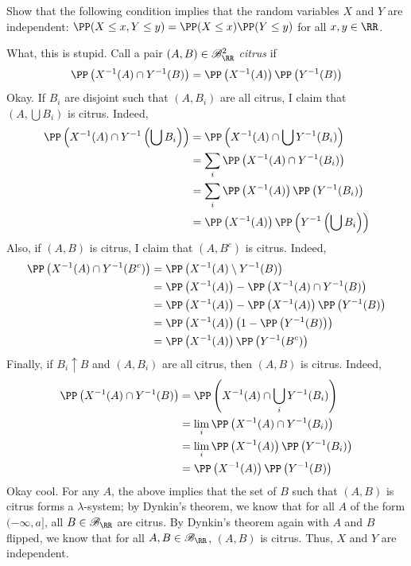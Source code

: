 \documentclass[11pt, headheight=30pt]{scrartcl}
\begin{document}
\begin{prob*}
    Show that the following condition implies that the random variables $X$ and $Y$
    are independent: $\PP(X \leq x, Y\leq y) = \PP(X\leq x)\PP(Y\leq y)$
    for all $x, y \in \RR$.
\end{prob*}
What, this is stupid. Call a pair $(A,B)\in \mathscr{B}_{\RR}^2$ \emph{citrus}
if
\[
    \PP\left(X^{-1}(A)\cap Y^{-1}(B)\right) = \PP\left(X^{-1}(A)\right)\PP\left(Y^{-1}(B)\right)
\]
Okay. If $B_i$ are disjoint such that $(A, B_i)$ are all citrus,
I claim that $(A, \bigcup B_i)$ is citrus. Indeed,
\begin{align*}
    \PP\left(X^{-1}(A)\cap Y^{-1}\left(\bigcup B_i\right)\right) &= \PP\left(X^{-1}(A)\cap \bigcup Y^{-1}(B_i)\right)\\
    &= \sum_i \PP\left(X^{-1}(A)\cap Y^{-1}(B_i)\right)\\
    &= \sum_i \PP\left(X^{-1}(A)\right)\PP\left(Y^{-1}(B_i)\right)\\
    &= \PP\left(X^{-1}(A)\right)\PP\left(Y^{-1}\left(\bigcup B_i\right)\right)
\end{align*}
Also, if $(A,B)$ is citrus, I claim that $(A, B^c)$ is citrus.
Indeed,
\begin{align*}
    \PP\left(X^{-1}(A)\cap Y^{-1}(B^c)\right) &= \PP\left(X^{-1}(A)\setminus Y^{-1}(B)\right)\\
    &= \PP\left(X^{-1}(A)\right) - \PP\left(X^{-1}(A)\cap Y^{-1}(B)\right)\\
    &= \PP\left(X^{-1}(A)\right) - \PP\left(X^{-1}(A)\right)\PP\left(Y^{-1}(B)\right)\\
    &= \PP\left(X^{-1}(A)\right)\left(1 - \PP\left(Y^{-1}(B)\right)\right)\\
    &= \PP\left(X^{-1}(A)\right)\PP\left(Y^{-1}(B^c)\right)
\end{align*}
Finally, if $B_i\uparrow B$
and $(A, B_i)$ are all citrus, then $(A, B)$ is citrus. Indeed,
\begin{align*}
    \PP\left(X^{-1}(A)\cap Y^{-1}(B)\right) &= \PP\left(X^{-1}(A)\cap \bigcup_i Y^{-1}(B_i)\right)\\
    &= \lim_i \PP\left(X^{-1}(A)\cap Y^{-1}(B_i)\right)\\
    &= \lim_i \PP\left(X^{-1}(A)\right)\PP\left(Y^{-1}(B_i)\right)\\
    &= \PP\left(X^{-1}(A)\right)\PP\left(Y^{-1}(B)\right)
\end{align*}
Okay cool. For any $A$, the above implies that the set of $B$
such that $(A,B)$ is citrus forms a $\lambda$-system; by Dynkin's
theorem, we know that for all $A$ of the form $(-\infty, a]$,
all $B\in \mathscr{B}_\RR$ are citrus. By Dynkin's theorem again with
$A$ and $B$ flipped, we know that for all $A, B \in \mathscr{B}_\RR$,
$(A,B)$ is citrus. Thus, $X$ and $Y$ are independent.
\end{document}
